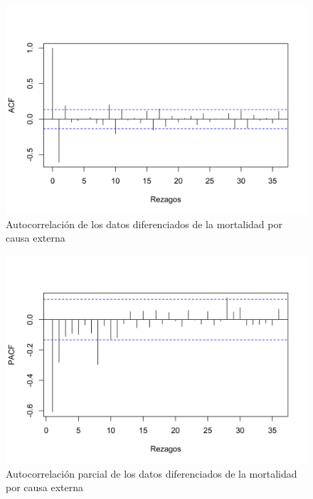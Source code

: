 \documentclass[
]{article}
\begin{document}
\begin{figure}[H]
\includegraphics[width=1\linewidth,height=1\textheight]{Tesis_files/figure-latex/externa_acf-1} \caption{Autocorrelación de los datos diferenciados de la mortalidad por causa externa}\label{fig:externa_acf}
\end{figure}

\begin{figure}[H]
\includegraphics[width=1\linewidth,height=1\textheight]{Tesis_files/figure-latex/externa_pacf-1} \caption{Autocorrelación parcial de los datos diferenciados de la mortalidad por causa externa}\label{fig:externa_pacf}
\end{figure}
\end{document}
